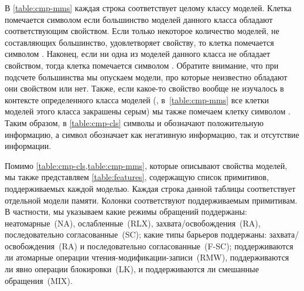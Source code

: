 В \cref{table:cmp-mms} каждая строка соответствует целому классу моделей. 
Клетка помечается символом \cmark\xspace если большинство моделей 
данного класса обладают соответствующим свойством. 
Если только некоторое количество моделей, не составляющих большинство, 
удовлетворяет свойству, то клетка помечается символом \wmark\xspace.
Наконец, если ни одна из моделей данного класса не обладает свойством, 
тогда клетка помечается символом \xmark\xspace.
Обратите внимание, что при подсчете большинства 
мы опускаем модели, про которые неизвестно обладают 
они свойством или нет. 
Также, если какое-то свойство вообще не изучалось 
в контексте определенного класса моделей 
(\ie, в~\cref{table:cmp-mms} все клетки моделей этого класса закрашены серым)
мы также помечаем клетку символом \xmark. 
Таким образом, в \cref{table:cmp-cls} символы \cmark\xspace и \wmark\xspace 
обозначают положительную информацию, а символ \xmark\xspace обозначает 
как негативную информацию, так и отсутствие информации. 

Помимо \cref{table:cmp-cls,table:cmp-mms}, 
которые описывают свойства моделей, мы также 
представляем \cref{table:features}, содержащую 
список примитивов, поддерживаемых каждой моделью. 
Каждая строка данной таблицы соответствует отдельной модели памяти.
Колонки соответствуют поддерживаемым примитивам. 
В частности, мы указываем какие режимы обращений поддержаны:
неатомарные~(NA), ослабленные~(RLX), захвата/освобождения~(RA), 
последовательно согласованные~(SC); 
какие типы барьеров поддержаны:
захвата/освобождения~(RA) и последовательно согласованные~(F-SC);
поддерживаются ли атомарные операции чтения-модификации-записи~(RMW),
поддерживаются ли явно операции блокировки~(LK),
и поддерживаются ли смешанные обращения~(MIX).   





